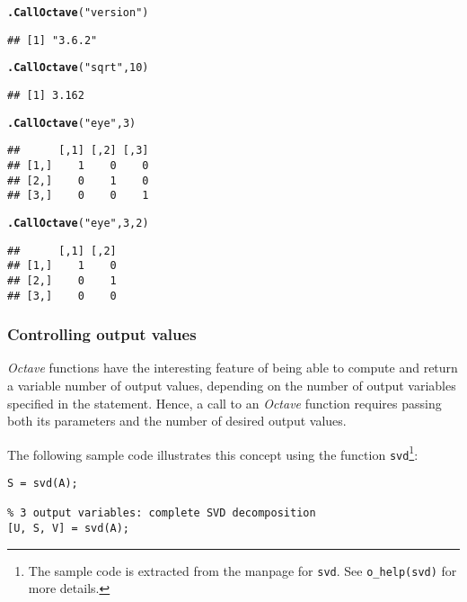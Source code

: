 \documentclass[english,10pt,a4paper]{article}\usepackage{graphicx, color}
\makeatletter
\newcommand{\hlfunctioncall}[1]{\textcolor[rgb]{0.501960784313725,0,0.329411764705882}{\textbf{#1}}}%
\newcommand{\hlstring}[1]{\textcolor[rgb]{0.6,0.6,1}{#1}}%
\newenvironment{kframe}{%
 \def\at@end@of@kframe{}%
 \ifinner\ifhmode%
  \def\at@end@of@kframe{\end{minipage}}%
  \begin{minipage}{\columnwidth}%
 \fi\fi%
 \def\FrameCommand##1{\hskip\@totalleftmargin \hskip-\fboxsep
 \colorbox{shadecolor}{##1}\hskip-\fboxsep
     \hskip-\linewidth \hskip-\@totalleftmargin \hskip\columnwidth}%
 \MakeFramed {\advance\hsize-\width
   \@totalleftmargin\z@ \linewidth\hsize
   \@setminipage}}%
 {\par\unskip\endMakeFramed%
 \at@end@of@kframe}
\newenvironment{knitrout}{}{} %
\let\proglang=\textit
\let\code=\texttt
\newcommand{\octave}{\proglang{Octave}\xspace}
\makeatother
\begin{document}
\begin{knitrout}
\color{fgcolor}\begin{kframe}
\begin{alltt}
\hlfunctioncall{.CallOctave}(\hlstring{"version"})
\end{alltt}
\begin{verbatim}
## [1] "3.6.2"
\end{verbatim}
\begin{alltt}
\hlfunctioncall{.CallOctave}(\hlstring{"sqrt"}, 10)
\end{alltt}
\begin{verbatim}
## [1] 3.162
\end{verbatim}
\begin{alltt}
\hlfunctioncall{.CallOctave}(\hlstring{"eye"}, 3)
\end{alltt}
\begin{verbatim}
##      [,1] [,2] [,3]
## [1,]    1    0    0
## [2,]    0    1    0
## [3,]    0    0    1
\end{verbatim}
\begin{alltt}
\hlfunctioncall{.CallOctave}(\hlstring{"eye"}, 3, 2)
\end{alltt}
\begin{verbatim}
##      [,1] [,2]
## [1,]    1    0
## [2,]    0    1
## [3,]    0    0
\end{verbatim}
\end{kframe}
\end{knitrout}


\subsubsection{Controlling output values}
\label{sec:argout}

\octave functions have the interesting feature of being able to compute
and return a variable number of output values, depending on the number of output
variables specified in the statement.
Hence, a call to an \octave function requires passing both its parameters and
the number of desired output values.

The following sample code illustrates this concept using the function
\code{svd}\footnote{The sample code is extracted from the manpage for
\code{svd}. See \code{o\_help(svd)} for more details.}:

\begin{Verbatim}[frame=single]
% single output variable: eigen values only
S = svd(A);

% 3 output variables: complete SVD decomposition  
[U, S, V] = svd(A);
\end{Verbatim}
\end{document}
